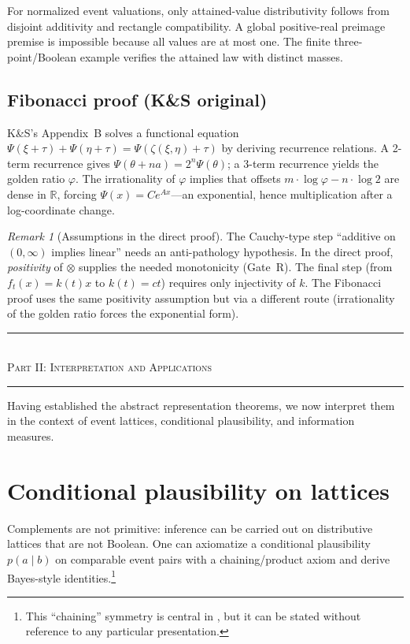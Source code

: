 \documentclass[11pt]{article}
\theoremstyle{definition}
\theoremstyle{remark}
\newtheorem{remark}[theorem]{Remark}
\begin{document}
For normalized event valuations, only attained-value distributivity follows
from disjoint additivity and rectangle compatibility. A global positive-real
preimage premise is impossible because all values are at most one. The finite
three-point/Boolean example verifies the attained law with distinct masses.

\subsection{Fibonacci proof (K\&S original)}

K\&S's Appendix~B solves a functional equation $\Psi(\xi+\tau)+\Psi(\eta+\tau)=\Psi(\zeta(\xi,\eta)+\tau)$
by deriving recurrence relations.  A 2-term recurrence gives $\Psi(\theta+na)=2^n\Psi(\theta)$;
a 3-term recurrence yields the golden ratio $\varphi$.  The irrationality of $\varphi$ implies
that offsets $m\cdot\log\varphi - n\cdot\log 2$ are dense in $\mathbb{R}$, forcing
$\Psi(x)=Ce^{Ax}$---an exponential, hence multiplication after a log-coordinate change.

\begin{remark}[Assumptions in the direct proof]
The Cauchy-type step ``additive on $(0,\infty)$ implies linear'' needs an anti-pathology hypothesis.
In the direct proof, \emph{positivity} of $\otimes$ supplies the needed monotonicity (Gate~R).
The final step (from $f_t(x)=k(t)x$ to $k(t)=ct$) requires only injectivity of $k$.
The Fibonacci proof uses the same positivity assumption but via a different route
(irrationality of the golden ratio forces the exponential form).
\end{remark}

\newpage
\bigskip
\begin{center}
\rule{0.5\textwidth}{0.4pt}\\[0.5em]
\textsc{Part II: Interpretation and Applications}\\[0.3em]
\rule{0.5\textwidth}{0.4pt}
\end{center}
\bigskip

\noindent
Having established the abstract representation theorems, we now interpret them in the context of
event lattices, conditional plausibility, and information measures.

\section{Conditional plausibility on lattices}
\label{sec:conditioning}

Complements are not primitive: inference can be carried out on distributive lattices that are not Boolean.
One can axiomatize a conditional plausibility $p(a\mid b)$ on comparable event pairs with a
chaining/product axiom and derive Bayes-style identities.\footnote{This ``chaining'' symmetry is central in
\cite{KnuthSkilling2012}, but it can be stated without reference to any particular presentation.}
\end{document}
